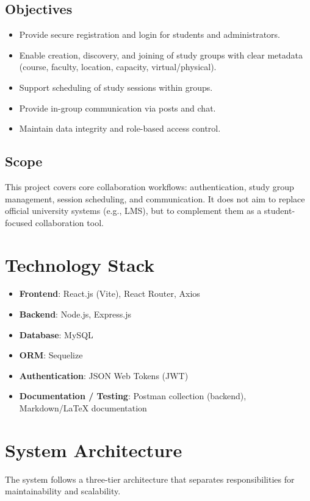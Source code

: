 \documentclass[12pt]{article}
\begin{document}
\subsection{Objectives}
\begin{itemize}
  \item Provide secure registration and login for students and administrators.
  \item Enable creation, discovery, and joining of study groups with clear metadata (course, faculty, location, capacity, virtual/physical).
  \item Support scheduling of study sessions within groups.
  \item Provide in-group communication via posts and chat.
  \item Maintain data integrity and role-based access control.
\end{itemize}

\subsection{Scope}
This project covers core collaboration workflows: authentication, study group management, session scheduling, and communication. It does not aim to replace official university systems (e.g., LMS), but to complement them as a student-focused collaboration tool.

\section{Technology Stack}
\begin{itemize}
  \item \textbf{Frontend}: React.js (Vite), React Router, Axios
  \item \textbf{Backend}: Node.js, Express.js
  \item \textbf{Database}: MySQL
  \item \textbf{ORM}: Sequelize
  \item \textbf{Authentication}: JSON Web Tokens (JWT)
  \item \textbf{Documentation / Testing}: Postman collection (backend), Markdown/LaTeX documentation
\end{itemize}

\section{System Architecture}
The system follows a three-tier architecture that separates responsibilities for maintainability and scalability.
\end{document}
